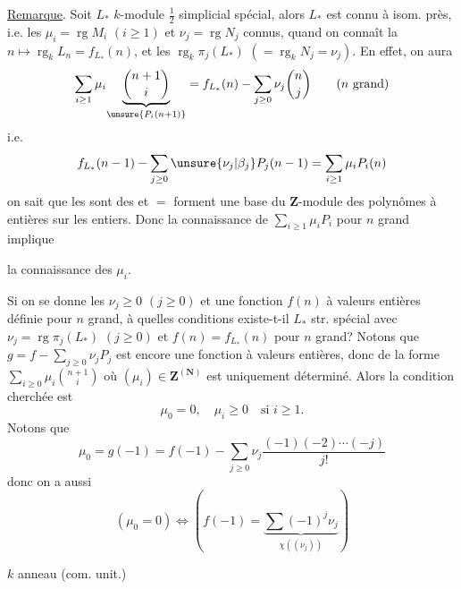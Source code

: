 \uline{Remarque}. Soit $L_*$ $k$-module $\frac12$ simplicial
 spécial, alors $L_*$ est connu à isom. près,
i.e. les $\mu_i=\operatorname{rg}M_i$ $(i\geq1)$ et $\nu_j=\operatorname{rg}N_j$
 
connus, quand on connaît la 
$n\longmapsto\operatorname{rg}_kL_n=f_{L_*}(n)$,
 et les
$\operatorname{rg}_k\pi_j(L_*)$ $(=\operatorname{rg}_kN_j=\nu_j)$.
En effet,
on aura
\[
\sum_{i\geq1}\mu_i\underset{\unsure{P_i(n+1)}}{\underbrace{\binom{n+1}{i}}}
=f_{L_*}(n)-\sum_{j\geq0}\nu_j\binom{n}{j}
\qquad(n\text{ grand})
\]
i.e.
\[
f_{L_*}(n-1)-\sum_{j\geq0}\unsure{\nu_j|\beta_j}P_j(n-1)
=\sum_{i\geq1}\mu_iP_i(n)
\]
on sait que les  
sont des
 et $=$ forment une
base du $\mathbf Z$-module des polynômes
à   entières sur les entiers.
Donc la connaissance de $\sum_{i\geq1}\mu_iP_i$
pour $n$ grand implique

la connaissance des $\mu_i$.

Si on se donne les  $\nu_j\geq0$
$(j\geq0)$ et une fonction  $f(n)$ à valeurs
entières définie pour $n$ grand, à quelles
conditions existe-t-il $L_*$ str. spécial
avec $\nu_j=\operatorname{rg}\pi_j(L_*)$ $(j\geq0)$ et
$f(n)=f_{L_*}(n)$ pour $n$ grand? Notons
que $g=f-\sum_{j\geq0}\nu_jP_j$ est encore une
fonction   à valeurs entières,
donc de la forme $\sum_{i\geq0}\mu_i\binom{n+1}{i}$
où $(\mu_i)\in\mathbf Z^{(\mathbf N)}$ est uniquement déterminé.
Alors la condition cherchée est
\[
\mu_0=0,\quad\mu_i\geq0\quad\text{si }i\geq1.
\]
Notons que 
\[
\mu_0=g(-1)=f(-1)-\sum_{j\geq0}\nu_j
\frac{(-1)(-2)\cdots(-j)}{j!}
\]
donc on a aussi
\[
(\mu_0=0)\Longleftrightarrow
\left(f(-1)=\underset{\chi((\nu_j))}{\underbrace{\sum(-1)^j\nu_j}}\right)
\]


$k$ anneau (com. unit.)

